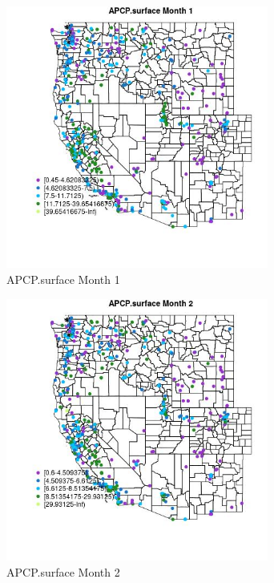 \begin{figure} 
\centering  
\includegraphics[width=0.77\textwidth]{Code_Outputs/ML_input_report_ML_input_PM25_Step5_part_d_de_duplicated_aves_ML_input_MapObsMo1APCPsurface.jpg} 
\caption{\label{fig:ML_input_report_ML_input_PM25_Step5_part_d_de_duplicated_aves_ML_inputMapObsMo1APCPsurface}APCP.surface Month 1} 
\end{figure} 
 

\clearpage 

\begin{figure} 
\centering  
\includegraphics[width=0.77\textwidth]{Code_Outputs/ML_input_report_ML_input_PM25_Step5_part_d_de_duplicated_aves_ML_input_MapObsMo2APCPsurface.jpg} 
\caption{\label{fig:ML_input_report_ML_input_PM25_Step5_part_d_de_duplicated_aves_ML_inputMapObsMo2APCPsurface}APCP.surface Month 2} 
\end{figure} 
 

